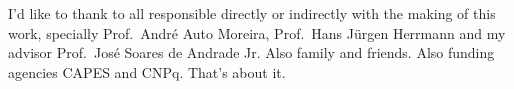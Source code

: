 \begin{agradecimentos}
    I'd like to thank to all responsible directly or indirectly with the making
    of this work, specially Prof.\ André Auto Moreira, Prof.\ Hans Jürgen
    Herrmann and my advisor Prof.\ José Soares de Andrade Jr. Also family and
    friends. Also funding agencies CAPES and CNPq. That's about it.
\end{agradecimentos}

